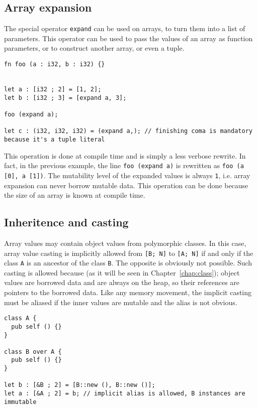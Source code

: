 \subsection {Array expansion}

The special operator \texttt{expand} can be used on arrays, to turn them into a
list of parameters. This operator can be used to pass the values of an array as
function parameters, or to construct another array, or even a tuple.

\begin{lstlisting}[style=coloredverbatim]
fn foo (a : i32, b : i32) {}


let a : [i32 ; 2] = [1, 2];
let b : [i32 ; 3] = [expand a, 3];

foo (expand a);

let c : (i32, i32, i32) = (expand a,); // finishing coma is mandatory because it's a tuple literal
\end{lstlisting}

This operation is done at compile time and is simply a less verbose rewrite. In
fact, in the previous example, the line \texttt{foo (expand a)} is rewritten as
\texttt{foo (a [0], a [1])}. The mutability level of the expanded values is
always \texttt{1}, i.e. array expansion can never borrow mutable data. This
operation can be done because the size of an array is known at compile time.

\subsection{Inheritence and casting}

Array values may contain object values from polymorphic classes. In this case,
array value casting is implicitly allowed from \texttt{[B; N]} to \texttt{[A;
    N]} if and only if the class \texttt{A} is an ancestor of the class
\texttt{B}. The opposite is obviously not possible. Such casting is allowed
because (as it will be seen in Chapter~\ref{chap:class}); object values are
borrowed data and are always on the heap, so their references are pointers to
the borrowed data. Like any memory movement, the implicit casting must be
aliased if the inner values are mutable and the alias is not obvious.

\begin{lstlisting}[style=coloredverbatim]
class A {
  pub self () {}
}

class B over A {
  pub self () {}
}

let b : [&B ; 2] = [B::new (), B::new ()];
let a : [&A ; 2] = b; // implicit alias is allowed, B instances are immutable
\end{lstlisting}

